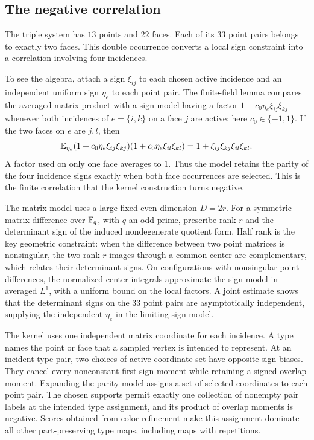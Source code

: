 \subsection*{The negative correlation}

The triple system has \(13\) points and \(22\) faces. Each of its
\(33\) point pairs belongs to exactly two faces. This double
occurrence converts a local sign constraint into a correlation
involving four incidences.

To see the algebra, attach a sign \(\xi_{ij}\) to each chosen active
incidence and an independent uniform sign \(\eta_e\) to each point
pair. The finite-field lemma compares the averaged matrix product with
a sign model having a factor
\(1+c_0\eta_e\xi_{ij}\xi_{kj}\) whenever both incidences of
\(e=\{i,k\}\) on a face \(j\) are active; here
\(c_0\in\{-1,1\}\). If the two faces on \(e\) are \(j,l\), then
\[
 \mathbb E_{\eta_e}
 (1+c_0\eta_e\xi_{ij}\xi_{kj})
 (1+c_0\eta_e\xi_{il}\xi_{kl})
 =
 1+\xi_{ij}\xi_{kj}\xi_{il}\xi_{kl}.
\]
A factor used on only one face averages to \(1\). Thus the model
retains the parity of the four incidence signs exactly when both
face occurrences are selected. This is the finite correlation that
the kernel construction turns negative.

The matrix model uses a large fixed even dimension \(D=2r\).
For a symmetric matrix difference over \(\mathbb F_q\), with \(q\) an odd
prime, prescribe rank \(r\)
and the determinant sign of the induced nondegenerate quotient form.
Half rank is the key geometric constraint: when the difference
between two point matrices is nonsingular, the two rank-\(r\) images
through a common center are complementary, which relates their
determinant signs. On configurations with nonsingular point
differences, the normalized center integrals approximate the sign
model in averaged \(L^1\), with a uniform bound on the local factors.
A joint estimate shows that the determinant signs on the \(33\) point
pairs are asymptotically independent, supplying the independent
\(\eta_e\) in the limiting sign model.

The kernel uses one independent matrix coordinate for each incidence.
A type names the point or face that a sampled vertex is intended to
represent. At an incident type pair, two choices of active coordinate
set have opposite sign biases. They cancel every nonconstant first
sign moment while retaining a signed overlap moment. Expanding the
parity model assigns a set of selected coordinates to each point
pair. The chosen supports permit exactly one collection of nonempty
pair labels at the intended type assignment, and its product of
overlap moments is negative. Scores obtained from color refinement
make this assignment dominate all other part-preserving type maps,
including maps with repetitions.

